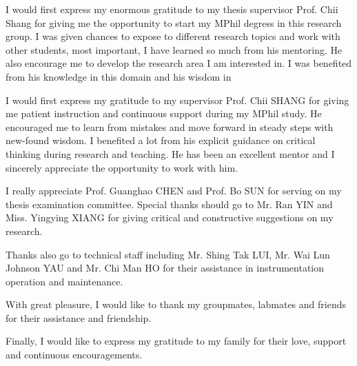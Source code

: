 \acknowledgments

I would first express my enormous gratitude to my thesis supervisor Prof. Chii Shang for giving me the opportunity to start my MPhil degress in this research group. I was given chances to expose to different research topics and work with other students, most important, I have learned so much from his mentoring.  He also encourage me to develop the research area I am interested in. I was benefited from his knowledge in this domain and his wisdom in 


I would first express my gratitude to my supervisor Prof. Chii SHANG for giving me patient instruction and continuous support during my MPhil study. He encouraged me to learn from mistakes and move forward in steady steps with new-found wisdom. I benefited a lot from his explicit guidance on critical thinking during research and teaching. He has been an excellent mentor and I sincerely appreciate the opportunity to work with him.

I really appreciate Prof. Guanghao CHEN and Prof. Bo SUN for serving on my thesis examination committee. Special thanks should go to Mr. Ran YIN and Miss. Yingying XIANG for giving critical and constructive suggestions on my research.

Thanks also go to technical staff including Mr. Shing Tak LUI, Mr. Wai Lun Johnson YAU and Mr. Chi Man HO for their assistance in instrumentation operation and maintenance.

With great pleasure, I would like to thank my groupmates, labmates and friends for their assistance and friendship.

Finally, I would like to express my gratitude to my family for their love, support and continuous encouragements.

\endacknowledgments
